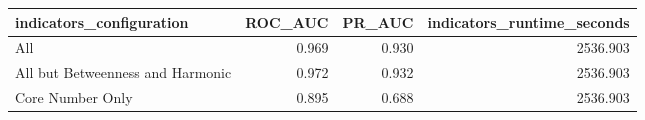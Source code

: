 \begin{tabular}{lrrr}
\toprule
indicators_configuration & ROC_AUC & PR_AUC & indicators_runtime_seconds \\
\midrule
All & 0.969 & 0.930 & 2536.903 \\
All but Betweenness and Harmonic & 0.972 & 0.932 & 2536.903 \\
Core Number Only & 0.895 & 0.688 & 2536.903 \\
\bottomrule
\end{tabular}
